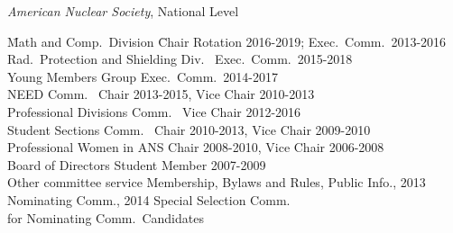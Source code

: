 \textit{American Nuclear Society}, National Level
\begin{tabbing}
\hspace*{2 em}\= Math and Comp.\ Division \hspace*{6em} \= Chair Rotation 2016-2019; Exec.\ Comm.\ 2013-2016 \\
%
\> Rad.\ Protection and Shielding Div.\ \> Exec.\ Comm.\ 2015-2018\\
%
\> Young Members Group \> Exec.\ Comm.\ 2014-2017\\
%
\> NEED Comm.\ \> Chair 2013-2015, Vice Chair 2010-2013\\
%
\> Professional Divisions Comm.\ \> Vice Chair 2012-2016 \\
%
\> Student Sections Comm.\ \> Chair 2010-2013, Vice Chair 2009-2010\\
%
\> Professional Women in ANS \> Chair 2008-2010, Vice Chair 2006-2008\\	
%
\> Board of Directors \> Student Member 2007-2009\\
%
\> Other committee service \>	Membership, Bylaws and Rules, Public Info., 2013 \\ \> \> Nominating Comm., 2014 Special Selection Comm.\ \\ \> \> for Nominating Comm.\ Candidates
\end{tabbing}


